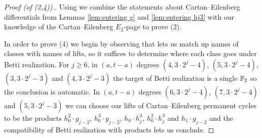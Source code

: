 \begin{proof}[Proof (of (2,4)).]
  Using  we combine the statements about Cartan--Eilenberg differentials from
  Lemmas \ref{lem:entering g} and \ref{lem:entering hj3} with our knowledge of the Cartan--Eilenberg $E_2$-page to prove (2).

  In order to prove (4) we begin by observing that  lets us match up names of classes with names of lifts, so it suffices to determine where each class goes under Betti realization.
  For $j \geq 6$, in $(a,t-a)$ degrees 
  $(4, 3 \cdot 2^j - 4)$, $(5, 3 \cdot 2^j - 4)$, $(3, 3 \cdot 2^j - 3)$ and $(4, 3 \cdot 2^j - 3)$
  the target of Betti realization is a single $\operatorname{\mathbb{F}}_2$ so the conclusion is automatic.
  In $(a,t-a)$ degrees $(6, 3 \cdot 2^j - 4)$, $(7, 3 \cdot 2^j - 4)$ and $(5, 3 \cdot 2^j - 3)$  we can choose our lifts of Cartan--Eilenberg permanent cycles to be the products
  $h_0^2 \cdot g_{j-2}$, $h_0^3 \cdot g_{j-2}$, $h_0 \cdot h_j^3$, $h_0^2 \cdot h_j^3$ and $h_1 \cdot g_{j-2}$
  and the compatibility of Betti realization with products lets us conclude.
\end{proof}







